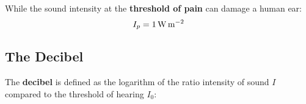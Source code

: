 While the sound intensity at the \textbf{threshold of pain} can damage a human
ear:
\begin{equation}
  I_p=\SI1{\watt\per\metre\squared}
\end{equation}
%
%
%
%



\subsection{The Decibel}

The \textbf{decibel} is defined as the logarithm of the ratio intensity of
sound $I$ compared to the threshold of hearing $I_0$:
 
